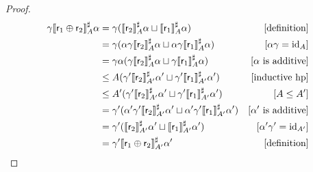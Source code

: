 \begin{proof}
	\begin{align*}
		\gamma \llbracket\mathsf{r}_1 \oplus \mathsf{r}_2\rrbracket^{\sharp}_A \alpha & = \gamma (\llbracket\mathsf{r}_2\rrbracket^{\sharp}_A \alpha \sqcup \llbracket\mathsf{r}_1\rrbracket^{\sharp}_A \alpha)                                          & [\text{definition}]           \\
		                                                        & = \gamma (\alpha \gamma \llbracket\mathsf{r}_2\rrbracket^{\sharp}_A \alpha \sqcup \alpha \gamma \llbracket\mathsf{r}_1\rrbracket^{\sharp}_A \alpha)              & [\alpha \gamma = \text{id}_A]       \\
		                                                        & = \gamma \alpha (\gamma \llbracket\mathsf{r}_2\rrbracket^{\sharp}_A \alpha \sqcup \gamma \llbracket\mathsf{r}_1\rrbracket^{\sharp}_A \alpha)                     & [\alpha \text{ is additive}]  \\
		                                                        & \le A (\gamma' \llbracket\mathsf{r}_2\rrbracket^{\sharp}_{A'} \alpha' \sqcup \gamma' \llbracket\mathsf{r}_1\rrbracket^{\sharp}_{A'} \alpha')                     & [\text{inductive hp}]         \\
		                                                        & \le A' (\gamma' \llbracket\mathsf{r}_2\rrbracket^{\sharp}_{A'} \alpha' \sqcup \gamma' \llbracket\mathsf{r}_1\rrbracket^{\sharp}_{A'} \alpha')                    & [A \le A']                    \\
		                                                        & = \gamma' (\alpha' \gamma' \llbracket\mathsf{r}_2\rrbracket^{\sharp}_{A'} \alpha' \sqcup \alpha' \gamma' \llbracket\mathsf{r}_1\rrbracket^{\sharp}_{A'} \alpha') & [\alpha' \text{ is additive}] \\
		                                                        & = \gamma' (\llbracket\mathsf{r}_2\rrbracket^{\sharp}_{A'} \alpha' \sqcup \llbracket\mathsf{r}_1\rrbracket^{\sharp}_{A'} \alpha')                                 & [\alpha' \gamma' = \text{id}_{A'}]  \\
		                                                        & = \gamma' \llbracket\mathsf{r}_1 \oplus \mathsf{r}_2\rrbracket^{\sharp}_{A'} \alpha'                                                                 & [\text{definition}]
	\end{align*}


\end{proof}
